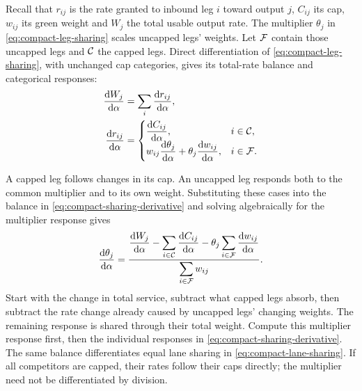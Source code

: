 \documentclass[10pt,a4paper]{article}
\newcommand{\rev}[1]{{\color{revisionred}#1}}
\begin{document}
\par\begin{samepage}
Recall that $r_{ij}$ is the rate granted to inbound leg $i$ toward output
$j$, $C_{ij}$ its cap, $w_{ij}$ its green weight and $W_j$ the total usable
output rate. The multiplier $\theta_j$ in \eqref{eq:compact-leg-sharing}
scales uncapped legs' weights. Let ${\cal F}$ contain those uncapped legs
and ${\cal C}$ the capped legs.
\rev{Direct differentiation of \eqref{eq:compact-leg-sharing}, with unchanged cap categories, gives its total-rate balance and categorical responses:}
\begin{equation}
 \begin{aligned}
 \frac{\mathrm dW_j}{\mathrm d\alpha}
 &=\sum_i\frac{\mathrm dr_{ij}}{\mathrm d\alpha},\\
 \frac{\mathrm dr_{ij}}{\mathrm d\alpha}
 &=\begin{cases}
 \displaystyle\frac{\mathrm dC_{ij}}{\mathrm d\alpha},&i\in{\cal C},\\
 \displaystyle w_{ij}\frac{\mathrm d\theta_j}{\mathrm d\alpha}
       +\theta_j\frac{\mathrm dw_{ij}}{\mathrm d\alpha},&i\in{\cal F}.
 \end{cases}
 \end{aligned}
 \label{eq:compact-sharing-derivative}
\end{equation}
\par\end{samepage}

A capped leg follows changes in its cap. An uncapped leg responds both
to the common multiplier and to its own weight. Substituting these cases
into \rev{the balance in \eqref{eq:compact-sharing-derivative} and solving algebraically for the multiplier response} gives
\begin{equation}
 \frac{\mathrm d\theta_j}{\mathrm d\alpha}
 =\frac{\displaystyle
 \frac{\mathrm dW_j}{\mathrm d\alpha}
 -\sum_{i\in{\cal C}}\frac{\mathrm dC_{ij}}{\mathrm d\alpha}
 -\theta_j\sum_{i\in{\cal F}}\frac{\mathrm dw_{ij}}{\mathrm d\alpha}}
 {\displaystyle\sum_{i\in{\cal F}}w_{ij}}.
 \label{eq:compact-sharing-level-derivative}
\end{equation}
Start with the change in total service, subtract what capped legs absorb,
then subtract the rate change already caused by uncapped legs' changing
weights. The remaining response is shared through their total weight.
Compute this multiplier response first, then the individual responses in
\eqref{eq:compact-sharing-derivative}. The same balance differentiates
equal lane sharing in \eqref{eq:compact-lane-sharing}.
If all competitors are capped, their rates follow their caps directly;
the multiplier need not be differentiated by division.
\end{document}
